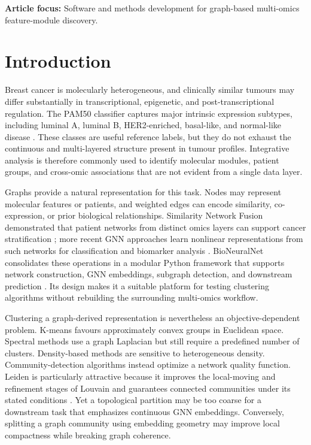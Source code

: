 \documentclass[11pt]{article}
\begin{document}
\medskip
\noindent\textbf{Article focus:} Software and methods development for graph-based multi-omics feature-module discovery.

\section{Introduction}

Breast cancer is molecularly heterogeneous, and clinically similar tumours may differ substantially in transcriptional, epigenetic, and post-transcriptional regulation. The PAM50 classifier captures major intrinsic expression subtypes, including luminal A, luminal B, HER2-enriched, basal-like, and normal-like disease \cite{parker2009,tcga2012}. These classes are useful reference labels, but they do not exhaust the continuous and multi-layered structure present in tumour profiles. Integrative analysis is therefore commonly used to identify molecular modules, patient groups, and cross-omic associations that are not evident from a single data layer.

Graphs provide a natural representation for this task. Nodes may represent molecular features or patients, and weighted edges can encode similarity, co-expression, or prior biological relationships. Similarity Network Fusion demonstrated that patient networks from distinct omics layers can support cancer stratification \cite{wang2014snf}; more recent GNN approaches learn nonlinear representations from such networks for classification and biomarker analysis \cite{wang2021mogonet,schultesasse2021}. BioNeuralNet consolidates these operations in a modular Python framework that supports network construction, GNN embeddings, subgraph detection, and downstream prediction \cite{ramos2026}. Its design makes it a suitable platform for testing clustering algorithms without rebuilding the surrounding multi-omics workflow.

Clustering a graph-derived representation is nevertheless an objective-dependent problem. K-means favours approximately convex groups in Euclidean space. Spectral methods use a graph Laplacian but still require a predefined number of clusters. Density-based methods are sensitive to heterogeneous density. Community-detection algorithms instead optimize a network quality function. Leiden is particularly attractive because it improves the local-moving and refinement stages of Louvain and guarantees connected communities under its stated conditions \cite{traag2019}. Yet a topological partition may be too coarse for a downstream task that emphasizes continuous GNN embeddings. Conversely, splitting a graph community using embedding geometry may improve local compactness while breaking graph coherence.
\end{document}
